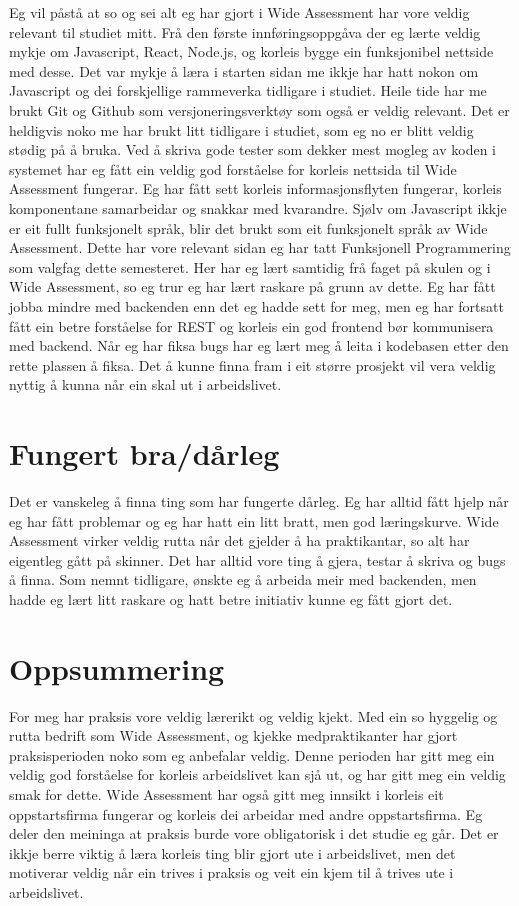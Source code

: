 \documentclass[12pt]{article}
\begin{document}
Eg vil påstå at so og sei alt eg har gjort i Wide Assessment har vore veldig relevant
til studiet mitt. Frå den første innføringsoppgåva der eg lærte veldig mykje om
Javascript, React, Node.js, og korleis bygge ein funksjonibel nettside med desse.
Det var mykje å læra i starten sidan me ikkje har hatt nokon om Javascript og
dei forskjellige rammeverka tidligare i studiet.
Heile tide har me brukt Git og Github som versjoneringsverktøy som også er veldig
relevant. Det er heldigvis noko me har brukt litt tidligare i studiet, som eg no
er blitt veldig stødig på å bruka.
Ved å skriva gode tester som dekker mest mogleg av koden i systemet
har eg fått ein veldig god forståelse for korleis nettsida til Wide Assessment
fungerar. Eg har fått sett korleis informasjonsflyten fungerar, korleis
komponentane samarbeidar og snakkar med kvarandre. Sjølv om Javascript ikkje er
eit fullt funksjonelt språk, blir det brukt som eit funksjonelt språk av Wide Assessment.
Dette har vore relevant sidan eg har tatt Funksjonell Programmering som valgfag
dette semesteret. Her har eg lært samtidig frå faget på skulen og i Wide Assessment,
so eg trur eg har lært raskare på grunn av dette.
Eg har fått jobba mindre med backenden enn det eg hadde sett for meg, men eg har
fortsatt fått ein betre forståelse for REST og korleis ein god frontend bør
kommunisera med backend. Når eg har fiksa bugs har eg lært meg å leita i
kodebasen etter den rette plassen å fiksa. Det å kunne finna fram i eit større
prosjekt vil vera veldig nyttig å kunna når ein skal ut i arbeidslivet.

\section{Fungert bra/dårleg}

Det er vanskeleg å finna ting som har fungerte dårleg. Eg har alltid fått hjelp
når eg har fått problemar og eg har hatt ein litt bratt, men god læringskurve.
Wide Assessment virker veldig rutta når det gjelder å ha praktikantar, so alt
har eigentleg gått på skinner. Det har alltid vore ting å gjera, testar å skriva
og bugs å finna. Som nemnt tidligare, ønskte eg å arbeida meir med
backenden, men hadde eg lært litt raskare og hatt betre initiativ kunne eg fått
gjort det.

\section{Oppsummering}

For meg har praksis vore veldig lærerikt og veldig kjekt. Med ein so hyggelig og
rutta bedrift som Wide Assessment, og kjekke medpraktikanter har gjort praksisperioden
noko som eg anbefalar veldig. Denne perioden har gitt meg ein veldig god forståelse
for korleis arbeidslivet kan sjå ut, og har gitt meg ein veldig smak for dette.
Wide Assessment har også gitt meg innsikt i korleis eit oppstartsfirma fungerar
og korleis dei arbeidar med andre oppstartsfirma. Eg deler den meininga at praksis
burde vore obligatorisk i det studie eg går. Det er ikkje berre viktig å læra
korleis ting blir gjort ute i arbeidslivet, men det motiverar veldig når ein
trives i praksis og veit ein kjem til å trives ute i arbeidslivet.
\end{document}
